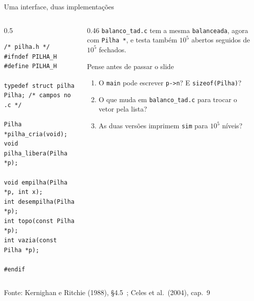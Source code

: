 \documentclass[aspectratio=169]{beamer}
\newcommand{\fonte}[1]{\vfill\hfill{\scriptsize\textcolor{UFSGray}{Fonte: #1}}}
\begin{document}
\begin{frame}[fragile]{Uma interface, duas implementações}
  \begin{columns}[T]
    \begin{column}{0.5\textwidth}
\begin{lstlisting}[style=codC]
/* pilha.h */
#ifndef PILHA_H
#define PILHA_H

typedef struct pilha Pilha; /* campos no .c */

Pilha *pilha_cria(void);
void pilha_libera(Pilha *p);

void empilha(Pilha *p, int x);
int desempilha(Pilha *p);
int topo(const Pilha *p);
int vazia(const Pilha *p);

#endif
\end{lstlisting}
    \end{column}
    \begin{column}{0.46\textwidth}
      \small \texttt{balanco\_tad.c} tem a mesma \texttt{balanceada}, agora
      com \texttt{Pilha *}, e testa também $10^5$ abertos seguidos de $10^5$
      fechados.
      \begin{block}{Pense antes de passar o slide}
        \small
        \begin{enumerate}
          \item O \texttt{main} pode escrever \texttt{p->n}? E
            \texttt{sizeof(Pilha)}?
          \item O que muda em \texttt{balanco\_tad.c} para trocar o vetor
            pela lista?
          \item As duas versões imprimem \texttt{sim} para $10^5$ níveis?
        \end{enumerate}
      \end{block}
    \end{column}
  \end{columns}
  \fonte{Kernighan e Ritchie (1988), §4.5~\cite{kernighan1988c};
    Celes et al.\ (2004), cap.~9~\cite{celes2004introducao}}
\end{frame}
\end{document}
